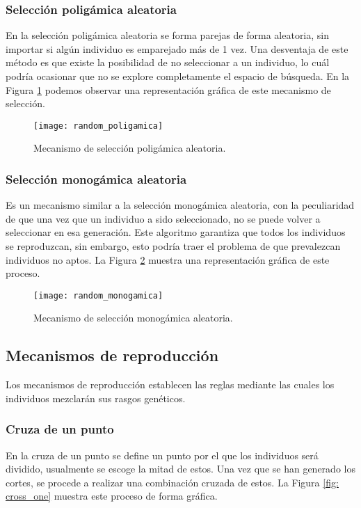\subsubsection{Selección poligámica aleatoria}
En la selección poligámica aleatoria se forma parejas de forma aleatoria, sin importar si algún individuo es emparejado más de 1 vez. Una desventaja de este método es que existe la posibilidad de no seleccionar a un individuo, lo cuál podría ocasionar que no se explore completamente el espacio de búsqueda. En la Figura \ref{fig: selection_poli} podemos observar una representación gráfica de este mecanismo de selección.

\begin{figure}[htbp]
	\centering
	\texttt{[image: random\_poligamica]}
	\caption{Mecanismo de selección poligámica aleatoria.}
	\label{fig: selection_poli}
\end{figure}

\subsubsection{Selección monogámica aleatoria}
Es un mecanismo similar a la selección monogámica aleatoria, con la peculiaridad de que una vez que un individuo a sido seleccionado, no se puede volver a seleccionar en esa generación. Este algoritmo garantiza que todos los individuos se reproduzcan, sin embargo, esto podría traer el problema de que prevalezcan individuos no aptos. La Figura \ref{fig: selection_mono} muestra una representación gráfica de este proceso.

\begin{figure}[htbp]
	\centering
	\texttt{[image: random\_monogamica]}
	\caption{Mecanismo de selección monogámica aleatoria.}
	\label{fig: selection_mono}
\end{figure}

\FloatBarrier
\subsection{Mecanismos de reproducción}
Los mecanismos de reproducción establecen las reglas mediante las cuales los individuos mezclarán sus rasgos genéticos.

\subsubsection{Cruza de un punto}
En la cruza de un punto se define un punto por el que los individuos será dividido, usualmente se escoge la mitad de estos. Una vez que se han generado los cortes, se procede a realizar una combinación cruzada de estos. La Figura \ref{fig: cross_one} muestra este proceso de forma gráfica.

